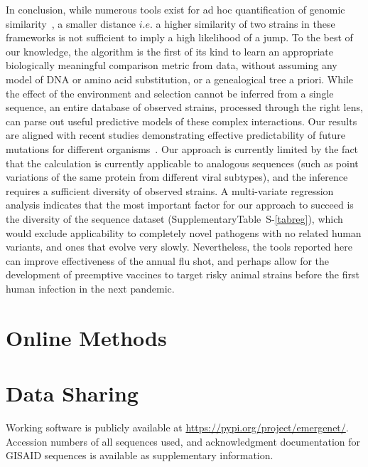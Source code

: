 \documentclass[onecolumn, compsoc,10pt]{IEEEtran}
\def\SUPPLEMENTARY{Supplementary}
\def\METHODS{Online Methods\xspace}
\begin{document}
In conclusion, while numerous tools exist for ad hoc quantification of genomic similarity~\cite{posada1998modeltest,goldberger2005genomic,huelsenbeck1997phylogeny,neher2014predicting,VanderMeer2010,Smith2009}, a smaller  distance $i.e.$ a higher similarity of two strains in  these frameworks is not sufficient to imply a high likelihood of a jump. To the best of our knowledge, the \enet algorithm is  the first of its kind to learn an appropriate biologically meaningful comparison metric from data, without assuming any model of DNA or amino acid substitution, or a genealogical tree a priori. While the effect of the environment and selection cannot be inferred from a single sequence, an entire database of observed strains, processed through the right lens, can parse out useful predictive models of these complex interactions. Our results are  aligned with recent studies demonstrating effective  predictability of  future mutations  for different organisms~\cite{mollentze2021identifying,maher2021predicting}. Our approach   is currently limited by the fact that the \qdist calculation is currently applicable to analogous sequences (such as point variations of the same protein from different viral subtypes), and the \enet inference requires a  sufficient diversity of observed strains. A multi-variate regression analysis indicates  that the most important factor for our approach to succeed is  the diversity of the sequence dataset (\SUPPLEMENTARY  Table~S-\ref{tabreg}), which would exclude applicability to completely novel pathogens with no related human variants, and ones that evolve very slowly. Nevertheless, the tools reported here can improve effectiveness of the annual flu shot, and perhaps allow for the development of preemptive vaccines to  target risky animal strains  before the first human infection in the next pandemic.

\section*{\METHODS}



\section*{Data Sharing} 

Working software is publicly available at \href{https://pypi.org/project/quasinet/}{https://pypi.org/project/emergenet/}.
Accession numbers of all sequences used, and acknowledgment documentation for GISAID sequences is available as supplementary information.
\end{document}
